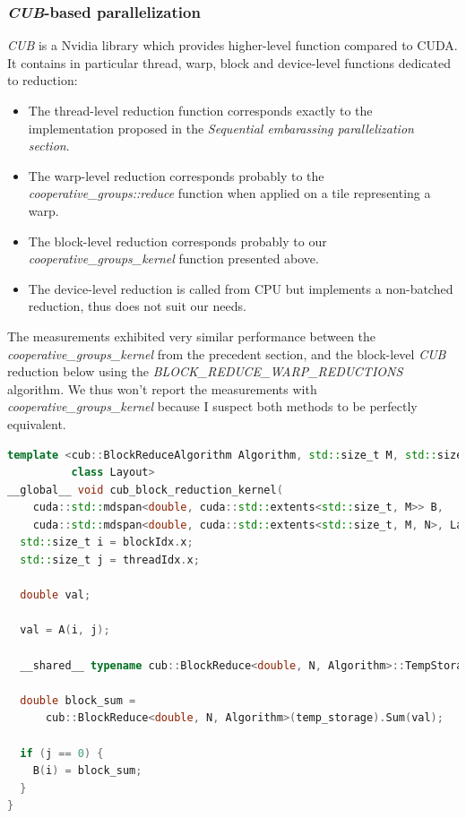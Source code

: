 \documentclass{article}
\begin{document}
\subsubsection{\textit{CUB}-based parallelization}

\textit{CUB} is a Nvidia library which provides higher-level function compared to CUDA. It contains in particular thread, warp, block and device-level functions dedicated to reduction:

\begin{itemize}
	\item The thread-level reduction function corresponds exactly to the implementation proposed in the \textit{Sequential embarassing parallelization section}.
	\item The warp-level reduction corresponds probably to the \textit{cooperative\_groups::reduce} function when applied on a tile representing a warp.
	\item The block-level reduction corresponds probably to our \textit{cooperative\_groups\_kernel} function presented above.
	\item The device-level reduction is called from CPU but implements a non-batched reduction, thus does not suit our needs.
\end{itemize}

The measurements exhibited very similar performance between the \textit{cooperative\_groups\_kernel} from the precedent section, and the block-level \textit{CUB} reduction below using the \textit{BLOCK\_REDUCE\_WARP\_REDUCTIONS} algorithm. We thus won't report the measurements with \textit{cooperative\_groups\_kernel} because I suspect both methods to be perfectly equivalent.

\begin{lstlisting}[language=C++]
template <cub::BlockReduceAlgorithm Algorithm, std::size_t M, std::size_t N,
          class Layout>
__global__ void cub_block_reduction_kernel(
    cuda::std::mdspan<double, cuda::std::extents<std::size_t, M>> B,
    cuda::std::mdspan<double, cuda::std::extents<std::size_t, M, N>, Layout> A) {
  std::size_t i = blockIdx.x;
  std::size_t j = threadIdx.x;

  double val;

  val = A(i, j);

  __shared__ typename cub::BlockReduce<double, N, Algorithm>::TempStorage temp_storage;

  double block_sum =
      cub::BlockReduce<double, N, Algorithm>(temp_storage).Sum(val);

  if (j == 0) {
    B(i) = block_sum;
  }
}
\end{lstlisting}
\end{document}

